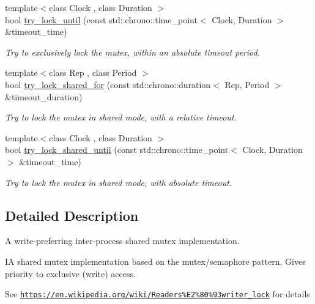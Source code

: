 \begin{DoxyCompactItemize}
{\footnotesize template$<$class Clock , class Duration $>$ }\\bool \hyperlink{classcpen333_1_1thread_1_1impl_1_1shared__mutex__exclusive_a99324f6fb6f6203faff33b1d41816998}{try\+\_\+lock\+\_\+until} (const std\+::chrono\+::time\+\_\+point$<$ Clock, Duration $>$ \&timeout\+\_\+time)
\begin{DoxyCompactList}\small\item\em Try to exclusively lock the mutex, within an absolute timeout period. \end{DoxyCompactList}\item 
{\footnotesize template$<$class Rep , class Period $>$ }\\bool \hyperlink{classcpen333_1_1thread_1_1impl_1_1shared__mutex__exclusive_a2bae38f1f1d94c6f632db97a58f4cd6f}{try\+\_\+lock\+\_\+shared\+\_\+for} (const std\+::chrono\+::duration$<$ Rep, Period $>$ \&timeout\+\_\+duration)
\begin{DoxyCompactList}\small\item\em Try to lock the mutex in shared mode, with a relative timeout. \end{DoxyCompactList}\item 
{\footnotesize template$<$class Clock , class Duration $>$ }\\bool \hyperlink{classcpen333_1_1thread_1_1impl_1_1shared__mutex__exclusive_ab6bf6ae1010273514d21705cccd5c19f}{try\+\_\+lock\+\_\+shared\+\_\+until} (const std\+::chrono\+::time\+\_\+point$<$ Clock, Duration $>$ \&timeout\+\_\+time)
\begin{DoxyCompactList}\small\item\em Try to lock the mutex in shared mode, with absolute timeout. \end{DoxyCompactList}\end{DoxyCompactItemize}


\subsection{Detailed Description}
A write-\/preferring inter-\/process shared mutex implementation. 

IA shared mutex implementation based on the mutex/semaphore pattern. Gives priority to exclusive (write) access.

See \href{https://en.wikipedia.org/wiki/Readers%E2%80%93writer_lock}{\tt https\+://en.\+wikipedia.\+org/wiki/\+Readers\%\+E2\%80\%93writer\+\_\+lock} for details 

